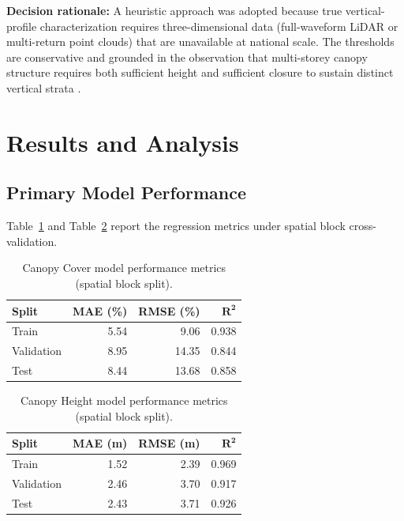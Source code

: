 \documentclass[12pt,a4paper,twoside]{article}
\begin{document}
\textbf{Decision rationale:} A heuristic approach was adopted because true
vertical-profile characterization requires three-dimensional data (full-waveform
LiDAR or multi-return point clouds) that are unavailable at national scale.  The
thresholds are conservative and grounded in the observation that multi-storey
canopy structure requires both sufficient height and sufficient closure to sustain
distinct vertical strata \citep{Whitehurst2013,Crookston1999}.

\section{Results and Analysis}\label{sec:results}

\subsection{Primary Model Performance}

Table~\ref{tab:results_cover} and Table~\ref{tab:results_height} report the
regression metrics under spatial block cross-validation.

\begin{table}[H]
\centering
\caption{Canopy Cover model performance metrics (spatial block split).}
\label{tab:results_cover}
\begin{tabular}{@{}l r r r@{}}
\toprule
\textbf{Split} & \textbf{MAE (\%)} & \textbf{RMSE (\%)} & $\boldsymbol{R^{2}}$ \\
\midrule
Train      & 5.54  & 9.06  & 0.938 \\
Validation & 8.95  & 14.35 & 0.844 \\
Test       & 8.44  & 13.68 & 0.858 \\
\bottomrule
\end{tabular}
\end{table}

\begin{table}[H]
\centering
\caption{Canopy Height model performance metrics (spatial block split).}
\label{tab:results_height}
\begin{tabular}{@{}l r r r@{}}
\toprule
\textbf{Split} & \textbf{MAE (m)} & \textbf{RMSE (m)} & $\boldsymbol{R^{2}}$ \\
\midrule
Train      & 1.52 & 2.39 & 0.969 \\
Validation & 2.46 & 3.70 & 0.917 \\
Test       & 2.43 & 3.71 & 0.926 \\
\bottomrule
\end{tabular}
\end{table}
\end{document}
